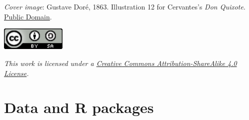 \documentclass[]{book}
\begin{document}
\emph{Cover image}: Gustave Doré, 1863. Illustration 12 for Cervantes's
\emph{Don Quixote}.
\href{https://commons.wikimedia.org/w/index.php?curid=677913}{Public
Domain}.

\includegraphics[width=1.22in]{images/cc-by-sa}

\emph{This work is licensed under a
\href{https://creativecommons.org/licenses/by-sa/4.0/}{Creative Commons
Attribution-ShareAlike 4.0 License}.}

\section*{Data and R packages}\label{data-and-r-packages}
\end{document}

